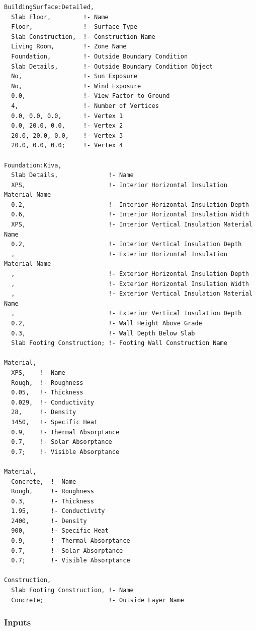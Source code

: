 \begin{lstlisting}
BuildingSurface:Detailed,
  Slab Floor,         !- Name
  Floor,              !- Surface Type
  Slab Construction,  !- Construction Name
  Living Room,        !- Zone Name
  Foundation,         !- Outside Boundary Condition
  Slab Details,       !- Outside Boundary Condition Object
  No,                 !- Sun Exposure
  No,                 !- Wind Exposure
  0.0,                !- View Factor to Ground
  4,                  !- Number of Vertices
  0.0, 0.0, 0.0,      !- Vertex 1
  0.0, 20.0, 0.0,     !- Vertex 2
  20.0, 20.0, 0.0,    !- Vertex 3
  20.0, 0.0, 0.0;     !- Vertex 4

Foundation:Kiva,
  Slab Details,              !- Name
  XPS,                       !- Interior Horizontal Insulation Material Name
  0.2,                       !- Interior Horizontal Insulation Depth
  0.6,                       !- Interior Horizontal Insulation Width
  XPS,                       !- Interior Vertical Insulation Material Name
  0.2,                       !- Interior Vertical Insulation Depth
  ,                          !- Exterior Horizontal Insulation Material Name
  ,                          !- Exterior Horizontal Insulation Depth
  ,                          !- Exterior Horizontal Insulation Width
  ,                          !- Exterior Vertical Insulation Material Name
  ,                          !- Exterior Vertical Insulation Depth
  0.2,                       !- Wall Height Above Grade
  0.3,                       !- Wall Depth Below Slab
  Slab Footing Construction; !- Footing Wall Construction Name

Material,
  XPS,    !- Name
  Rough,  !- Roughness
  0.05,   !- Thickness
  0.029,  !- Conductivity
  28,     !- Density
  1450,   !- Specific Heat
  0.9,    !- Thermal Absorptance
  0.7,    !- Solar Absorptance
  0.7;    !- Visible Absorptance

Material,
  Concrete,  !- Name
  Rough,     !- Roughness
  0.3,       !- Thickness
  1.95,      !- Conductivity
  2400,      !- Density
  900,       !- Specific Heat
  0.9,       !- Thermal Absorptance
  0.7,       !- Solar Absorptance
  0.7;       !- Visible Absorptance

Construction,
  Slab Footing Construction, !- Name
  Concrete;                  !- Outside Layer Name
\end{lstlisting}

\subsubsection{Inputs}

